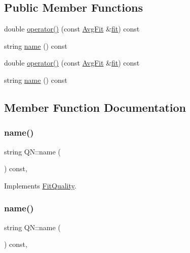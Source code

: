 \subsection*{Public Member Functions}
\begin{DoxyCompactItemize}
\item 
double \mbox{\hyperlink{classQN_a3328fcfb7a093b9e843cd0da56bf09f3}{operator()}} (const \mbox{\hyperlink{classAvgFit}{Avg\+Fit}} \&\mbox{\hyperlink{src_2lib_2three__point__timeslice__fitting_8h_aa079c61e69a3946e3351db64a3478612}{fit}}) const
\item 
string \mbox{\hyperlink{classQN_ad80e962cb22f614fd9946e5cf1432e19}{name}} () const
\item 
double \mbox{\hyperlink{classQN_a3328fcfb7a093b9e843cd0da56bf09f3}{operator()}} (const \mbox{\hyperlink{classAvgFit}{Avg\+Fit}} \&\mbox{\hyperlink{src_2lib_2three__point__timeslice__fitting_8h_aa079c61e69a3946e3351db64a3478612}{fit}}) const
\item 
string \mbox{\hyperlink{classQN_ad80e962cb22f614fd9946e5cf1432e19}{name}} () const
\end{DoxyCompactItemize}


\subsection{Member Function Documentation}
\mbox{\label{classQN_ad80e962cb22f614fd9946e5cf1432e19}} 
\subsubsection{\texorpdfstring{name()}{name()}\hspace{0.1cm}{\footnotesize\ttfamily [1/2]}}
{\footnotesize\ttfamily string Q\+N\+::name (\begin{DoxyParamCaption}{ }\end{DoxyParamCaption}) const\hspace{0.3cm}{\ttfamily [inline]}, {\ttfamily [virtual]}}



Implements \mbox{\hyperlink{classFitQuality_a3423e236f25d68cf822094b363a74780}{Fit\+Quality}}.

\mbox{\label{classQN_ad80e962cb22f614fd9946e5cf1432e19}} 
\subsubsection{\texorpdfstring{name()}{name()}\hspace{0.1cm}{\footnotesize\ttfamily [2/2]}}
{\footnotesize\ttfamily string Q\+N\+::name (\begin{DoxyParamCaption}{ }\end{DoxyParamCaption}) const\hspace{0.3cm}{\ttfamily [inline]}, {\ttfamily [virtual]}}



